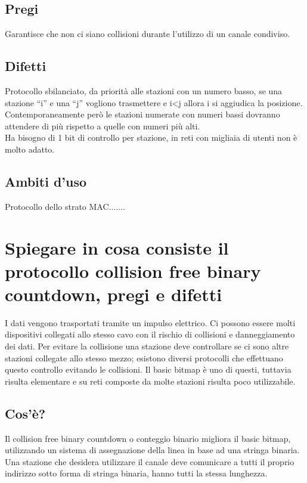 \subsection{Pregi}
Garantisce che non ci siano collisioni durante l'utilizzo di un canale condiviso.

\subsection{Difetti}
Protocollo sbilanciato, da priorità alle stazioni con un numero basso, se una stazione “i” e una “j” vogliono trasmettere e i<j allora i si aggiudica la posizione.\\
Contemporaneamente però le stazioni numerate con numeri bassi dovranno attendere di più rispetto a quelle con numeri più alti.\\
Ha bisogno di 1 bit di controllo per stazione, in reti con migliaia di utenti non è molto adatto.

\subsection{Ambiti d'uso}
Protocollo dello strato MAC.......

\section{Spiegare in cosa consiste il protocollo collision free binary countdown, pregi e difetti}

I dati vengono trasportati tramite un impulso elettrico. Ci possono essere molti dispositivi collegati allo stesso cavo con il rischio di collisioni e danneggiamento dei dati.
Per evitare la collisione una stazione deve controllare se ci sono altre stazioni collegate allo stesso mezzo; esistono diversi protocolli che effettuano questo controllo evitando le collisioni.
Il basic bitmap è uno di questi, tuttavia risulta elementare e su reti composte da molte stazioni risulta poco utilizzabile.

\subsection{Cos'è?}
Il collision free binary countdown o conteggio binario migliora il basic bitmap, utilizzando un sistema di assegnazione della linea in base ad una stringa binaria.
Una stazione che desidera utilizzare il canale deve comunicare a tutti il proprio indirizzo sotto forma di stringa binaria, hanno tutti la stessa lunghezza.

